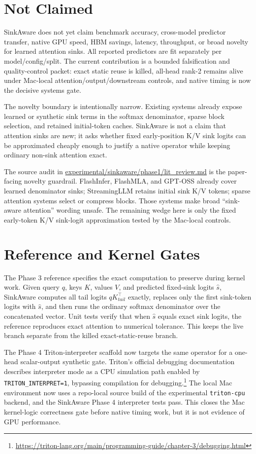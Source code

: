 \documentclass{article}
\begin{document}
\section{Not Claimed}

SinkAware does not yet claim benchmark accuracy, cross-model predictor
transfer, native GPU speed, HBM savings, latency, throughput, or broad novelty
for learned attention sinks. All reported predictors are fit separately per
model/config/split. The current contribution is a bounded falsification and
quality-control packet: exact static reuse is killed, all-head rank-2 remains
alive under Mac-local attention/output/downstream controls, and native timing
is now the decisive systems gate.

The novelty boundary is intentionally narrow. Existing systems already expose
learned or synthetic sink terms in the softmax denominator, sparse block
selection, and retained initial-token caches. SinkAware is not a claim that
attention sinks are new; it asks whether fixed early-position K/V sink logits
can be approximated cheaply enough to justify a native operator while keeping
ordinary non-sink attention exact.

The source audit in \url{experimental/sinkaware/phase1/lit_review.md} is the
paper-facing novelty guardrail. FlashInfer, FlashMLA, and GPT-OSS already cover
learned denominator sinks; StreamingLLM retains initial sink K/V tokens; sparse
attention systems select or compress blocks. Those systems make broad
``sink-aware attention'' wording unsafe. The remaining wedge here is only the
fixed early-token K/V sink-logit approximation tested by the Mac-local controls.

\section{Reference and Kernel Gates}

The Phase 3 reference specifies the exact computation to preserve during kernel work. Given query $q$, keys $K$, values $V$, and predicted fixed-sink logits $\hat{s}$, SinkAware computes all tail logits $qK_{tail}^{\top}$ exactly, replaces only the first sink-token logits with $\hat{s}$, and then runs the ordinary softmax denominator over the concatenated vector. Unit tests verify that when $\hat{s}$ equals exact sink logits, the reference reproduces exact attention to numerical tolerance. This keeps the live branch separate from the killed exact-static-reuse branch.

The Phase 4 Triton-interpreter scaffold now targets the same operator for a one-head scalar-output synthetic gate. Triton's official debugging documentation describes interpreter mode as a CPU simulation path enabled by \texttt{TRITON\_INTERPRET=1}, bypassing compilation for debugging.\footnote{\url{https://triton-lang.org/main/programming-guide/chapter-3/debugging.html}} The local Mac environment now uses a repo-local source build of the experimental \texttt{triton-cpu} backend, and the SinkAware Phase 4 interpreter tests pass. This closes the Mac kernel-logic correctness gate before native timing work, but it is not evidence of GPU performance.
\end{document}
